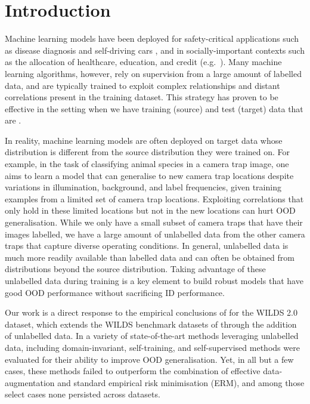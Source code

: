 \section{Introduction}\label{sec:intro}
Machine learning models have been deployed for safety-critical applications such as disease
diagnosis \citep{watson2019clinical} and self-driving cars \citep{yu2020bdd100k}, and in
socially-important contexts such as the allocation of healthcare, education, and credit (e.g.\
\citealp{DunYiLanReetal19, HurAde17}). 
%
%
Many machine learning algorithms, however, rely on supervision from a large amount of labelled
data, and are typically trained to exploit complex relationships and distant correlations present
in the training dataset. 
%
This strategy has proven to be effective in the setting when we have training (source) and test
(target) data that are \iid{}.

In reality, machine learning models are often deployed on target data whose distribution is
different from the source distribution they were trained on. 
%
For example, in the task of classifying animal species in a camera trap image, one aims to learn a
model that can generalise to new camera trap locations despite variations in illumination,
background, and label frequencies, given training examples from a limited set of camera trap
locations.
%
Exploiting correlations that only hold in these limited locations but not in the new locations can
hurt \ac{OOD} generalisation.
%
While we only have a small subset of camera traps that have their images labelled, we have a large
amount of unlabelled data from the other camera traps that capture diverse operating conditions. 
%
In general, unlabelled data is much more readily available than labelled data and can often be
obtained from distributions beyond the source distribution.
%
Taking advantage of these unlabelled data during training is a key element to build robust models
that have good OOD performance without sacrificing \ac{ID} performance.
%

Our work is a direct response to the empirical conclusions of \citet{SagWeiLeeGaoetal22} for the
WILDS 2.0 dataset, which extends the WILDS benchmark datasets of \citet{koh2021wilds} through the
addition of unlabelled data.
%
In \citet{SagWeiLeeGaoetal22} a variety of state-of-the-art methods leveraging unlabelled data,
including domain-invariant, self-training, and self-supervised methods were evaluated for their
ability to improve OOD generalisation.
%
Yet, in all but a few cases, these methods failed to outperform the combination of effective
data-augmentation and standard empirical risk minimisation (ERM), and among those select cases none
persisted across datasets.

